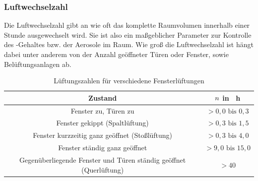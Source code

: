 \subsubsection*{Luftwechselzahl}
Die Luftwechselzahl gibt an wie oft das komplette Raumvolumen innerhalb einer Stunde ausgewechselt wird. Sie ist also ein maßgeblicher Parameter zur Kontrolle des -Gehaltes bzw. der Aerosole im Raum. Wie groß die Luftwechselzahl ist hängt dabei unter anderem von der Anzahl geöffneter Türen oder Fenster, sowie Belüftungsanlagen ab.

\begin{table}[h!]
	\renewcommand*{\arraystretch}{1.2}
	\centering
	\caption{Lüftungszahlen für verschiedene Fensterlüftungen \cite{Bosy.17.10.2020}}
	\label{tab:lueftungen}
	\begin{tabulary}{1.1\textwidth}{C|C}
		\hline
		\textbf{Zustand} 	& \textbf{$\boldmath n$ in \si{\per \hour}}\\
		\hline
		Fenster zu, Türen zu 												& $> 0,0 \text{ bis } 0,3$\\
		Fenster gekippt (Spaltlüftung)  						& $> 0,3 \text{ bis } 1,5$\\
		Fenster kurzzeitig ganz geöffnet (Stoßlüftung) & $> 0,3 \text{ bis } 4,0$\\
		Fenster ständig ganz geöffnet & $> 9,0 \text{ bis } 15,0$\\
		Gegenüberliegende Fenster und Türen ständig geöffnet (Querlüftung) & $> 40$\\
		\hline			
	\end{tabulary}
\end{table}
\FloatBarrier
	
